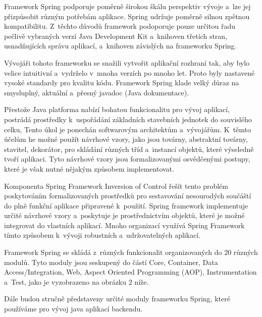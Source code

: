 \documentclass[twoside, 12pt]{article}
\begin{document}
{%
Framework Spring podporuje poměrně širokou škálu perspektiv vývoje
a~lze jej přizpůsobit různým potřebám aplikace.
Spring udržuje poměrně silnou zpětnou kompatibilitu.
Z~těchto důvodů framework podoporuje pouze určitou řadu
pečlivě vybraných verzí Java Development Kit
a~knihoven třetích stran, usnadňujících správu aplikací,
a~knihoven závislých na frameworku Spring.

Vývojáři tohoto frameworku se snažili vytvořit aplikační rozhraní tak,
aby bylo velice intuitivní a~vydrželo v~mnoha verzích po mnoho let.
Proto byly nastavené vysoké standardy pro kvalitu kódu.
Framework Spring klade velký důraz na smysluplný, aktuální a~přesný javadoc
(Java dokumentace).

Přestože Java platforma nabízí bohatou funkcionalitu pro vývoj aplikací,
postrádá prostředky k~uspořádání základních stavebních jednotek do souvislého celku,
Tento úkol je ponechán softwarovým architektům a~vývojářům.
K~těmto účelům he možné použít návrhové vzory, jako jsou továrny, abstraktní továrny,
stavitel, dekorátor, pro skládání různých tříd a~instancí objektů,
které výseledně tvoří aplikaci.
Tyto návrhové vzory jsou formalizovanými osvědčenými postupy,
které je však nutné nějakým způsobem implementovat.

Komponenta Spring Framework Inversion of Control řešít tento problém
poskytováním formalizovaných prostředků pro sestavování nesourodých
součáští do plně funkční aplikace připravené k~použití.
Spring framework  implementuje určité návrhové vzory a~poskytuje
je prostřednictvím objektů, které je možné integrovat do vlastních aplikací.
Mnoho organizací využívá Spring Framework tímto způsobem k~vývoji robustních
a~udržovatelných aplikací.

Framework Spring se skládá z~různých funkcionalit organizovaných do 20 různých modulů.
Tyto moduly jsou seskupený do částí Core, Container, Data Access/Integration,
Web, Aspect Oriented Programming (AOP), Instrumentation a~Test,
jako je vyzobrazeno na obrázku 2 níže.

\cite{springFrameworkDocs}

\obrazek
{}

Dále budou stručně představeny určité moduly frameworku Spring,
které používáme pro vývoj java aplikací backendu.

}
\end{document}
